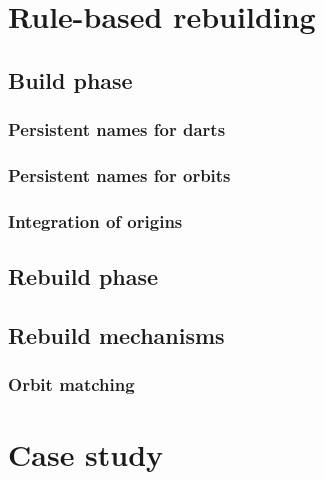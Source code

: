 \documentclass[preprint,review,12pt,x11names]{elsarticle}
\begin{document}


\section{Rule-based rebuilding}%
\label{sec:rule-based-rebu}

\subsection{Build phase}%
\label{sec:build-phase}

\subsubsection{Persistent names for darts}%
\label{sec:pers-names-darts}

\subsubsection{Persistent names for orbits}%
\label{sec:pers-names-orbits}

\subsubsection{Integration of origins}%
\label{sec:integration-origins}

\subsection{Rebuild phase}%
\label{sec:rebuild-phase}

\subsection{Rebuild mechanisms}%
\label{sec:rebuild-mechanisms}

\subsubsection{Orbit matching}%
\label{sec:orbit-matching}

\section{Case study}%
\label{sec:case-study}








\end{document}
